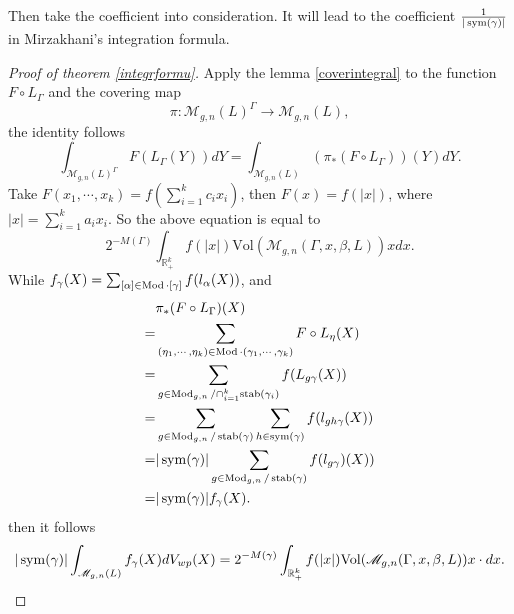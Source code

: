 Then take the coefficient into consideration.
It will lead to the coefficient $\frac{1}{|\operatorname{sym}(\gamma)|}$ in Mirzakhani's integration formula.
\begin{proof}[Proof of theorem \ref{integrformu}]
 Apply the lemma \ref{coverintegral} to the function $F\circ L_\Gamma$ and the covering map
$$
\pi\colon \mathscr{M}_{g,n}(L)^\Gamma\to  \mathscr{M}_{g,n}(L),
$$
the identity follows $$
\int_{\mathscr{M}_{g,n}(L)^\Gamma}F(L_\Gamma(Y))dY=\int_{\mathscr{M}_{g,n}(L)}(\pi_*(F\circ L_{\Gamma}))(Y)dY.
$$
Take $F(x_1,\cdots,x_k)=f(\sum_{i=1}^kc_ix_i)$, then $F(x)=f(|x|)$, where $|x|=\sum_{i=1}^ka_ix_i$.
So the above equation is equal to  $$
2^{-M(\Gamma)}\int_{\mathbb{R}_+^k}f(|x|)\mathrm{Vol}(\mathscr{M}_{g,n}(\Gamma,x,\beta,L))xdx.
$$
While $f_\gamma(X)=\sum_{[\alpha]\in \operatorname{Mod}\cdot [\gamma]}f(l_\alpha(X))$, and 
$$
\begin{aligned}
&\pi_*(F\circ L_\Gamma)(X)\\
=&\sum\limits_{(\eta_1,\cdots,\eta_k)\in \operatorname{Mod}\cdot (\gamma_1,\cdots,\gamma_k)} F\circ L_\eta (X)\\
=&\sum_{g\in \operatorname{Mod}_{g,n}/\cap_{i=1}^k\operatorname{stab}(\gamma_i)}f( L_{g\gamma}(X))\\
=&\sum\limits_{g\in \operatorname{Mod}_{g,n}/\operatorname{stab}(\gamma)} \sum\limits_{h\in \operatorname{sym}(\gamma)} f(l_{gh\gamma}(X)) \\
=&|\operatorname{sym}(\gamma)|\sum\limits_{g\in \operatorname{Mod}_{g,n}/\operatorname{stab}(\gamma)}f(l_{g\gamma})(X))\\
=&|\operatorname{sym}(\gamma)|f_{\gamma}(X).\\
\end{aligned}
$$
then it follows 
$$
|\operatorname{sym}(\gamma)|\int_{\mathscr{M}_{g,n}(L)}f_\gamma(X)dV_{wp}(X)=2^{-M(\gamma)}\int_{\mathbb{R}_+^k}f(|x|)\mathrm{Vol}(\mathscr{M}_{g,n}(\Gamma,x,\beta,L))x\cdot dx.
$$
\end{proof}

  
 
